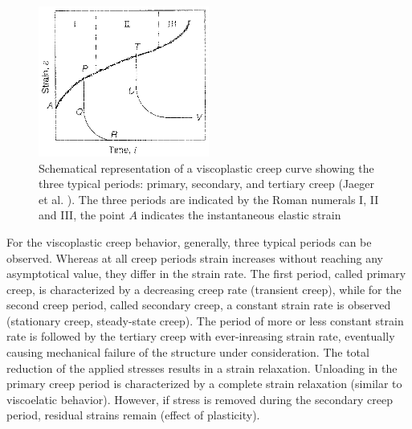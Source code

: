 \begin{figure}[htb!]
\begin{center}
\footnotesize
\includegraphics[width=0.5\textwidth]{figures/creep.eps}
\caption{Schematical representation of a viscoplastic creep curve showing the three typical periods: primary, secondary, and tertiary creep (Jaeger et al. \cite{JCZ:2007}). The three periods are indicated by the Roman numerals I, II and III, the point $A$ indicates the instantaneous elastic strain}
\label{fig:creep}
\end{center}
\end{figure}

For the viscoplastic creep behavior, generally, three typical periods can be observed. Whereas at all creep periods strain increases without reaching any asymptotical value, they differ in the strain rate. The first period, called primary creep, is characterized by a decreasing creep rate (transient creep), while for the second creep period, called secondary creep, a constant strain rate is observed (stationary creep, steady-state creep). The period of more or less constant strain rate is followed by the tertiary creep with ever-inreasing strain rate, eventually causing mechanical failure of the structure under consideration. The total reduction of the applied stresses results in a strain relaxation. Unloading in the primary creep period is characterized by a complete strain relaxation (similar to viscoelatic behavior). However, if stress is removed during the secondary creep period, residual strains remain (effect of plasticity).

